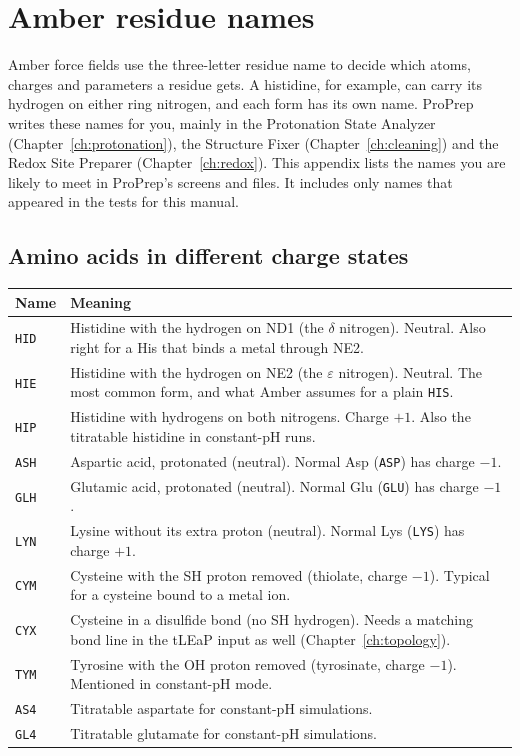\chapter{Amber residue names}
\label{app:residues}

Amber force fields use the three-letter residue name to decide which atoms,
charges and parameters a residue gets. A histidine, for example, can carry its
hydrogen on either ring nitrogen, and each form has its own name. ProPrep
writes these names for you, mainly in the Protonation State Analyzer
(Chapter~\ref{ch:protonation}), the Structure Fixer
(Chapter~\ref{ch:cleaning}) and the Redox Site Preparer
(Chapter~\ref{ch:redox}). This appendix lists the names you are likely to meet
in ProPrep's screens and files. It includes only names that appeared in the
tests for this manual.

\section*{Amino acids in different charge states}

\begin{longtable}{@{}p{2.2cm}p{11.5cm}@{}}
\toprule
\textbf{Name} & \textbf{Meaning} \\
\midrule
\endhead
\texttt{HID} & Histidine with the hydrogen on ND1 (the $\delta$ nitrogen).
  Neutral. Also right for a His that binds a metal through NE2. \\
\texttt{HIE} & Histidine with the hydrogen on NE2 (the $\varepsilon$
  nitrogen). Neutral. The most common form, and what Amber assumes for a plain
  \texttt{HIS}. \\
\texttt{HIP} & Histidine with hydrogens on both nitrogens. Charge $+1$. Also
  the titratable histidine in constant-pH runs. \\
\texttt{ASH} & Aspartic acid, protonated (neutral). Normal Asp (\texttt{ASP})
  has charge $-1$. \\
\texttt{GLH} & Glutamic acid, protonated (neutral). Normal Glu (\texttt{GLU})
  has charge $-1$. \\
\texttt{LYN} & Lysine without its extra proton (neutral). Normal Lys
  (\texttt{LYS}) has charge $+1$. \\
\texttt{CYM} & Cysteine with the SH proton removed (thiolate, charge $-1$).
  Typical for a cysteine bound to a metal ion. \\
\texttt{CYX} & Cysteine in a disulfide bond (no SH hydrogen). Needs a matching
  bond line in the tLEaP input as well (Chapter~\ref{ch:topology}). \\
\texttt{TYM} & Tyrosine with the OH proton removed (tyrosinate, charge $-1$).
  Mentioned in constant-pH mode. \\
\texttt{AS4} & Titratable aspartate for constant-pH simulations. \\
\texttt{GL4} & Titratable glutamate for constant-pH simulations. \\
\bottomrule
\end{longtable}

